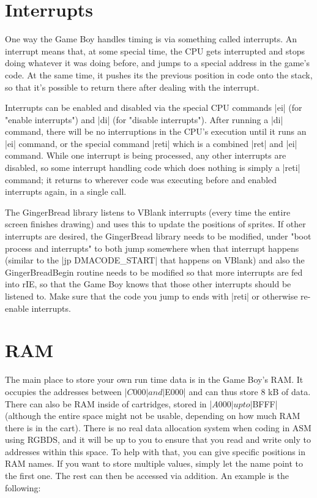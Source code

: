 \documentclass[11pt]{book}
\begin{document}
\section{Interrupts} 
\label{weinterruptthisprogramme}
One way the Game Boy handles timing is via something called interrupts. An interrupt means that, at some special time, the CPU gets interrupted and stops doing whatever it was doing before, and jumps to a special address in the game's code. At the same time, it pushes its the previous position in code onto the stack, so that it's possible to return there after dealing with the interrupt. 

Interrupts can be enabled and disabled via the special CPU commands |ei| (for "enable interrupts") and |di| (for "disable interrupts"). After running a |di| command, there will be no interruptions in the CPU's execution until it runs an |ei| command, or the special command |reti| which is a combined |ret| and |ei| command. While one interrupt is being processed, any other interrupts are disabled, so some interrupt handling code which does nothing is simply a |reti| command; it returns to wherever code was executing before and enabled interrupts again, in a single call. 

The GingerBread library listens to VBlank interrupts (every time the entire screen finishes drawing) and uses this to update the positions of sprites. If other interrupts are desired, the GingerBread library needs to be modified, under "boot process and interrupts" to both jump somewhere when that interrupt happens (similar to the |jp DMACODE_START| that happens on VBlank) and also the GingerBreadBegin routine needs to be modified so that more interrupts are fed into rIE, so that the Game Boy knows that those other interrupts should be listened to. Make sure that the code you jump to ends with |reti| or otherwise re-enable interrupts.

\section{RAM}
\label{ram}
The main place to store your own run time data is in the Game Boy’s RAM. It occupies the addresses between |$C000| and |$E000| and can thus store 8 kB of data. There can also be RAM inside of cartridges, stored in |$A000| up to |$BFFF| (although the entire space might not be usable, depending on how much RAM there is in the cart). There is no real data allocation system when coding in ASM using RGBDS, and it will be up to you to ensure that you read and write only to addresses within this space. To help with that, you can give specific positions in RAM names. If you want to store multiple values, simply let the name point to the first one. The rest can then be accessed via addition. An example is the following:
\end{document}
